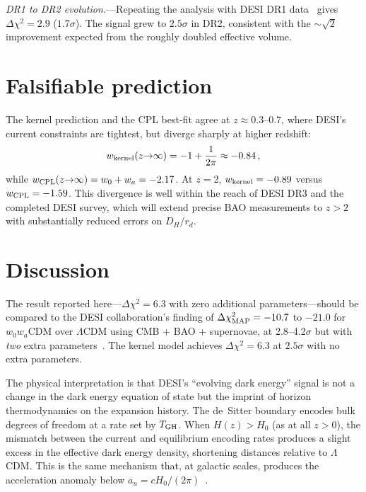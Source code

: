 \documentclass[aps,prl,twocolumn,showpacs,preprintnumbers,amsmath,amssymb,superscriptaddress]{revtex4-2}
\begin{document}
\textit{DR1 to DR2 evolution.}---Repeating the analysis with DESI 
DR1 data~\cite{DESI_DR1} gives $\Delta\chi^2 = 2.9$ ($1.7\sigma$). 
The signal grew to $2.5\sigma$ in DR2, consistent with the 
$\sim\!\sqrt{2}$ improvement expected from the roughly doubled 
effective volume.

\section{Falsifiable prediction}

The kernel prediction and the CPL best-fit agree at $z \approx 0.3$--$0.7$, 
where DESI's current constraints are tightest, but diverge sharply at 
higher redshift:
\begin{equation}
w_{\rm kernel}(z{\to}\infty) = -1 + \frac{1}{2\pi} \approx -0.84\,,
\end{equation}
while $w_{\rm CPL}(z{\to}\infty) = w_0 + w_a = -2.17$. At $z=2$, 
$w_{\rm kernel} = -0.89$ versus $w_{\rm CPL} = -1.59$. This 
divergence is well within the reach of DESI DR3 and the completed 
DESI survey, which will extend precise BAO measurements to $z > 2$ 
with substantially reduced errors on $D_H/r_d$.

\section{Discussion}

The result reported here---$\Delta\chi^2 = 6.3$ with zero additional 
parameters---should be compared to the DESI collaboration's finding 
of $\Delta\chi^2_{\rm MAP} = -10.7$ to $-21.0$ for $w_0 w_a$CDM 
over $\Lambda$CDM using CMB + BAO + supernovae, at 2.8--4.2$\sigma$ 
but with \emph{two} extra parameters~\cite{DESI_DR2}. The kernel model 
achieves $\Delta\chi^2 = 6.3$ at $2.5\sigma$ with no extra parameters.

The physical interpretation is that DESI's ``evolving dark energy'' 
signal is not a change in the dark energy equation of state but the 
imprint of horizon thermodynamics on the expansion history. The 
de~Sitter boundary encodes bulk degrees of freedom at a rate set by 
$T_{\rm GH}$. When $H(z) > H_0$ (as at all $z > 0$), the mismatch 
between the current and equilibrium encoding rates produces a slight 
excess in the effective dark energy density, shortening distances 
relative to $\Lambda$CDM. This is the same mechanism that, at 
galactic scales, produces the acceleration anomaly below 
$a_u = cH_0/(2\pi)$~\cite{Paper1}.
\end{document}

